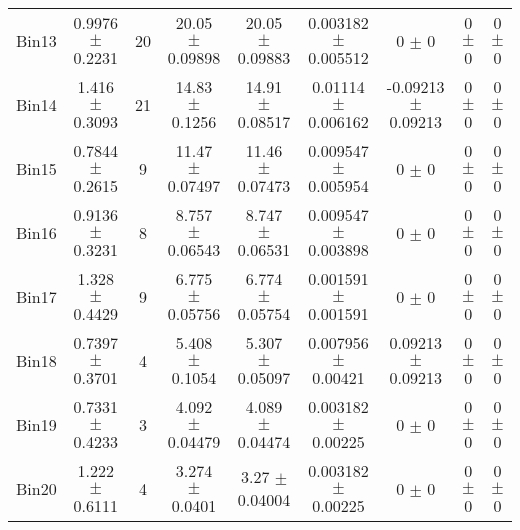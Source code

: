\begin{tabular}{@{\extracolsep{4pt}}lcccccccc@{}}
     Bin13 & 0.9976 $\pm$ 0.2231 & 20 & 20.05 $\pm$ 0.09898 & 20.05 $\pm$ 0.09883 & 0.003182 $\pm$ 0.005512 & 0 $\pm$ 0 & 0 $\pm$ 0 & 0 $\pm$ 0 \\ 
     Bin14 & 1.416 $\pm$ 0.3093 & 21 & 14.83 $\pm$ 0.1256 & 14.91 $\pm$ 0.08517 & 0.01114 $\pm$ 0.006162 & -0.09213 $\pm$ 0.09213 & 0 $\pm$ 0 & 0 $\pm$ 0 \\ 
     Bin15 & 0.7844 $\pm$ 0.2615 & 9 & 11.47 $\pm$ 0.07497 & 11.46 $\pm$ 0.07473 & 0.009547 $\pm$ 0.005954 & 0 $\pm$ 0 & 0 $\pm$ 0 & 0 $\pm$ 0 \\ 
     Bin16 & 0.9136 $\pm$ 0.3231 & 8 & 8.757 $\pm$ 0.06543 & 8.747 $\pm$ 0.06531 & 0.009547 $\pm$ 0.003898 & 0 $\pm$ 0 & 0 $\pm$ 0 & 0 $\pm$ 0 \\ 
     Bin17 & 1.328 $\pm$ 0.4429 & 9 & 6.775 $\pm$ 0.05756 & 6.774 $\pm$ 0.05754 & 0.001591 $\pm$ 0.001591 & 0 $\pm$ 0 & 0 $\pm$ 0 & 0 $\pm$ 0 \\ 
     Bin18 & 0.7397 $\pm$ 0.3701 & 4 & 5.408 $\pm$ 0.1054 & 5.307 $\pm$ 0.05097 & 0.007956 $\pm$ 0.00421 & 0.09213 $\pm$ 0.09213 & 0 $\pm$ 0 & 0 $\pm$ 0 \\ 
     Bin19 & 0.7331 $\pm$ 0.4233 & 3 & 4.092 $\pm$ 0.04479 & 4.089 $\pm$ 0.04474 & 0.003182 $\pm$ 0.00225 & 0 $\pm$ 0 & 0 $\pm$ 0 & 0 $\pm$ 0 \\ 
     Bin20 & 1.222 $\pm$ 0.6111 & 4 & 3.274 $\pm$ 0.0401 & 3.27 $\pm$ 0.04004 & 0.003182 $\pm$ 0.00225 & 0 $\pm$ 0 & 0 $\pm$ 0 & 0 $\pm$ 0 \\ 
\hline\hline
  \end{tabular}
